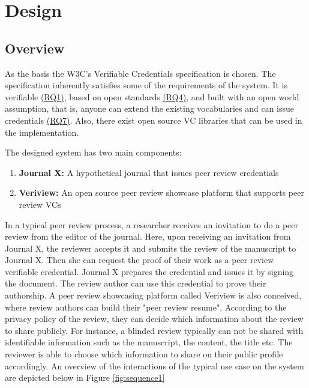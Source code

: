 \section{Design}




\subsection{Overview}

As the basis the W3C's Verifiable Credentials specification \parencite{Sporny.18Kas2019} is chosen. The specification inherently satisfies some of the requirements of the system. It is verifiable \hyperref[rq:verifiable]{(RQ1)}, based on open standards \hyperref[rq:open-standards]{(RQ4)}, and built with an open world assumption, that is, anyone can extend the existing vocabularies and can issue credentials \hyperref[rq:compatible]{(RQ7)}. Also, there exist open source \acrshort{VC} libraries that can be used in the implementation.

The designed system has two main components:

\begin{enumerate}
    \item \textbf{Journal X:} A hypothetical journal that issues peer review credentials
    \item \textbf{Veriview:} An open source peer review showcase platform that supports peer review \acrshort{VC}s
\end{enumerate}


In a typical peer review process, a researcher receives an invitation to do a peer review from the editor of the journal. Here, upon receiving an invitation from Journal X, the reviewer accepts it and submits the review of the manuscript to Journal X. Then she can request the proof of their work as a peer review verifiable credential. Journal X prepares the credential and issues it by signing the document. The review author can use this credential to prove their authorship. A peer review showcasing platform called Veriview is also conceived, where review authors can build their "peer review resume". According to the privacy policy of the review, they can decide which information about the review to share publicly. For instance, a blinded review typically can not be shared with identifiable information such as the manuscript, the content, the title etc. The reviewer is able to choose which information to share on their public profile accordingly. An overview of the interactions of the typical use case on the system are depicted below in Figure \ref{fig:sequence1} 

